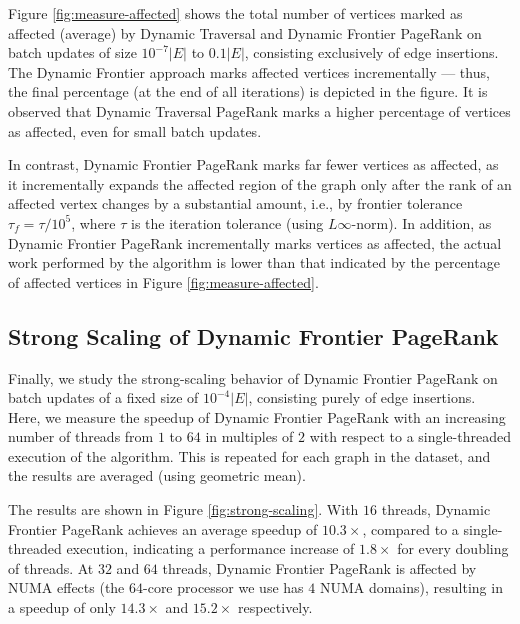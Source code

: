 Figure \ref{fig:measure-affected} shows the total number of vertices marked as affected (average) by Dynamic Traversal and Dynamic Frontier PageRank on batch updates of size $10^{-7}|E|$ to $0.1|E|$, consisting exclusively of edge insertions. The Dynamic Frontier approach marks affected vertices incrementally --- thus, the final percentage (at the end of all iterations) is depicted in the figure. It is observed that Dynamic Traversal PageRank marks a higher percentage of vertices as affected, even for small batch updates. In contrast, Dynamic Frontier PageRank marks far fewer vertices as affected, as it incrementally expands the affected region of the graph only after the rank of an affected vertex changes by a substantial amount, i.e., by frontier tolerance $\tau_f = \tau / 10^5$, where $\tau$ is the iteration tolerance (using $L\infty$-norm). In addition, as Dynamic Frontier PageRank incrementally marks vertices as affected, the actual work performed by the algorithm is lower than that indicated by the percentage of affected vertices in Figure \ref{fig:measure-affected}.






\subsection{Strong Scaling of Dynamic Frontier PageRank}

Finally, we study the strong-scaling behavior of Dynamic Frontier PageRank on batch updates of a fixed size of $10^{-4} |E|$, consisting purely of edge insertions. Here, we measure the speedup of Dynamic Frontier PageRank with an increasing number of threads from $1$ to $64$ in multiples of $2$ with respect to a single-threaded execution of the algorithm. This is repeated for each graph in the dataset, and the results are averaged (using geometric mean).

The results are shown in Figure \ref{fig:strong-scaling}. With $16$ threads, Dynamic Frontier PageRank achieves an average speedup of $10.3\times$, compared to a single-threaded execution, indicating a performance increase of $1.8\times$ for every doubling of threads. At $32$ and $64$ threads, Dynamic Frontier PageRank is affected by NUMA effects (the $64$-core processor we use has $4$ NUMA domains), resulting in a speedup of only $14.3\times$ and $15.2\times$ respectively.

\ignore{}
